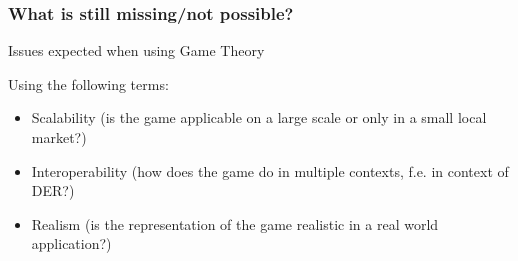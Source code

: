 
\subsubsection{What is still missing/not possible?}

Issues expected when using Game Theory

Using the following terms:
\begin{itemize}
	\item Scalability (is the game applicable on a large scale or only in a small local market?)
	\item Interoperability (how does the game do in multiple contexts, f.e. in context of DER?)
	\item Realism (is the representation of the game realistic in a real world application?)
\end{itemize}